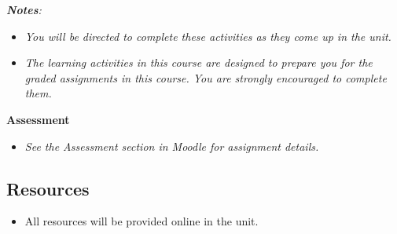 \documentclass[
  letterpaper,
  DIV=11,
  numbers=noendperiod]{scrreprt}
\providecommand{\tightlist}{%
  \setlength{\itemsep}{0pt}\setlength{\parskip}{0pt}}\usepackage{longtable,booktabs,array}
\begin{document}
\begin{tcolorbox}
\begin{tcolorbox}[enhanced jigsaw, toprule=.15mm, colback=white, colframe=quarto-callout-note-color-frame, arc=.35mm, opacityback=0, breakable, rightrule=.15mm, bottomrule=.15mm, leftrule=.75mm, left=2mm]
\emph{\textbf{Notes}:}

\begin{itemize}
\tightlist
\item
  \emph{You will be directed to complete these activities as they come
  up in the unit.}
\item
  \emph{The learning activities in this course are designed to prepare
  you for the graded assignments in this course. You are strongly
  encouraged to complete them.}
\end{itemize}

\end{tcolorbox}

\end{tcolorbox}

\begin{tcolorbox}[enhanced jigsaw, toprule=.15mm, colback=white, colframe=quarto-callout-note-color-frame, arc=.35mm, opacityback=0, breakable, rightrule=.15mm, bottomrule=.15mm, leftrule=.75mm, left=2mm]

\textbf{Assessment}

\begin{itemize}
\tightlist
\item
  \emph{See the Assessment section in Moodle for assignment details.}
\end{itemize}

\end{tcolorbox}

\subsection*{Resources}\label{resources-5}

\begin{itemize}
\tightlist
\item
  All resources will be provided online in the unit.
\end{itemize}
\end{document}
